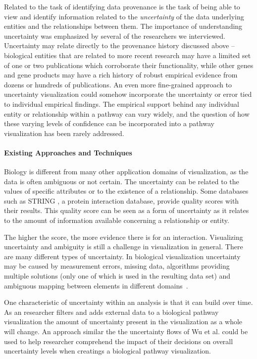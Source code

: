 Related to the task of identifying data provenance is the task of being able to view and identify information related to the \textit{uncertainty} of the data underlying entities and the relationships between them.
The importance of understanding uncertainty was emphasized by several of the researchers we interviewed.
Uncertainty may relate directly to the provenance history discussed above -- biological entities that are related to more recent research may have a limited set of one or two publications which corroborate their functionality, while other genes and gene products may have a rich history of robust empirical evidence from dozens or hundreds of publications.
An even more fine-grained approach to uncertainty visualization could somehow incorporate the uncertainty or error tied to individual empirical findings.
The empirical support behind any individual entity or relationship within a pathway can vary widely, and the question of how these varying levels of confidence can be incorporated into a pathway visualization has been rarely addressed.

\paragraph*{Existing Approaches and Techniques}
Biology is different from many other application domains of visualization, as the data is often ambiguous or not certain\cite{kohlbacher2014multivariate}. 
The uncertainty can be related to the values of specific attributes or to the existence of a relationship.
Some databases such as STRING \cite{STRING2005}, a protein interaction database, provide quality scores with their results.
This quality score can be seen as a form of uncertainty as it relates to the amount of information available concerning a relationship or entity. 

The higher the score, the more evidence there is for an interaction.
Visualizing uncertainty and ambiguity is still a challenge in visualization in general.
There are many different types of uncertainty\cite{skeels2010uncertainty}. In biological visualization uncertainty may be caused by measurement errors, missing data, algorithms providing multiple solutions (only one of which is used in the resulting data set) and ambiguous mapping between elements in different domains~\cite{kohlbacher2014multivariate}.

One characteristic of uncertainty within an analysis is that it can build over time. 
As an researcher filters and adds external data to a biological pathway visualization the amount of uncertainty present in the visualization as a whole will change. 
An approach similar the the uncertainty flows of Wu et al.\cite{wu2012uncertainty} could be used to help researcher comprehend the impact of their decisions on overall uncertainty levels when creatings a biological pathway visualization. 

